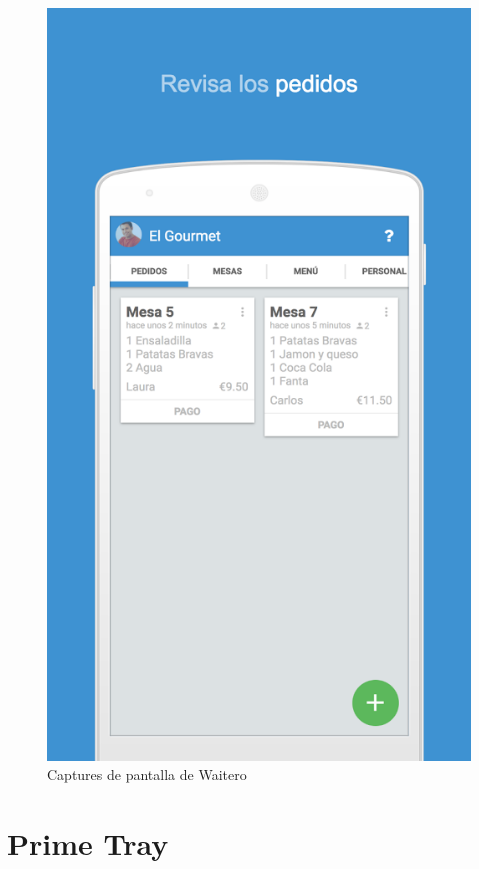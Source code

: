 \begin{figure}[H]
\includegraphics[scale=0.15]{Figures/waitero-3.png}
\caption{Captures de pantalla de Waitero}
\end{figure}




\section{Prime Tray}

